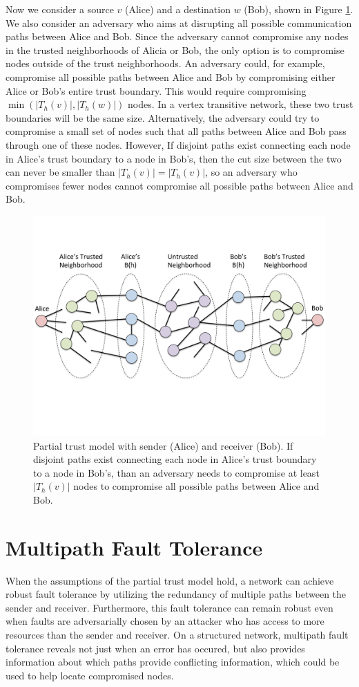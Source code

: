 \documentclass[prodmode,permissions]{acmsmall-ec16}
\begin{document}
Now we consider a source $v$ (Alice) and a destination $w$ (Bob),
shown in Figure \ref{fig:trust-source-destionation}. We also consider an adversary who aims at disrupting all possible communication paths between Alice and Bob. Since the adversary cannot compromise any nodes in the trusted neighborhoods of Alicia or Bob, the only option is to compromise nodes outside of the trust neighborhoods. An adversary could, for example, compromise all possible paths between Alice and Bob by compromising either Alice or Bob's entire trust boundary. This would require compromising $\min(|T_h(v)|, |T_h(w)|)$ nodes. In a vertex transitive network, these two trust boundaries will be the same size. Alternatively, the adversary could try to compromise a small set of nodes such that all paths between Alice and Bob pass through one of these nodes. However, If disjoint paths exist connecting each node in Alice's trust boundary to
a node in Bob's, then the cut size between the two can never be smaller than
$|T_h(v)| = |T_h(v)|$, so an adversary who compromises fewer nodes cannot compromise all possible paths between Alice and Bob.

\begin{figure}
\centerline{\includegraphics[height =.4 \textwidth]{fig-bob_Alice_trusted_neigh2}}
\caption{
Partial trust model with sender (Alice) and receiver (Bob).
If disjoint paths exist connecting each node in Alice's trust boundary to
a node in Bob's,
than an adversary needs to compromise at least $|T_h(v)|$ nodes to
compromise all possible paths between Alice and Bob.
}
\label{fig:trust-source-destionation}
\end{figure}

\section{Multipath Fault Tolerance}

When the assumptions of the partial trust model hold, a network can achieve
robust fault tolerance by utilizing the redundancy of multiple paths
between the sender and receiver.
Furthermore, this fault tolerance can remain robust even when faults are
adversarially chosen by an attacker who has access to more resources
than the sender and receiver.
On a structured network, multipath fault tolerance reveals not just when
an error has occured, but also provides information about which paths provide
conflicting information,
which could be used to help locate compromised nodes.
\end{document}
